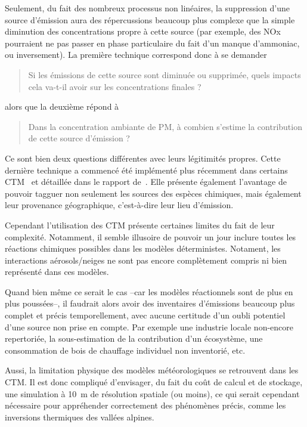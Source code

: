 Seulement, du fait des nombreux processus non linéaires, la suppression d'une source
d'émission aura des répercussions beaucoup plus complexe que la simple diminution des
concentrations propre à cette source (par exemple, des NOx pourraient ne pas passer en
phase particulaire du fait d'un manque d'ammoniac, ou inversement). La première technique
correspond donc à se demander 
\begin{quote}
    Si les émissions de cette source sont diminuée ou supprimée, quels impacts cela va-t-il
    avoir sur les concentrations finales ?
\end{quote}
alors que la deuxième répond à
\begin{quote}
    Dans la concentration ambiante de PM, à combien s'estime la contribution de cette source
    d'émission ?
\end{quote}
Ce sont bien deux questions différentes avec leurs légitimités propres.
Cette dernière technique a commencé été implémenté plus récemment dans certains
CTM~\autocite{wangDevelopment2009,wagstromDevelopment2008,kranenburgSource2013,brandtContribution2013}
et détaillée dans le rapport de~\textcite{mirceaEuropean2020}. Elle présente également
l'avantage de pouvoir tagguer non seulement les sources des espèces chimiques, mais
également leur provenance géographique, c'est-à-dire leur lieu d'émission.

Cependant l'utilisation des CTM présente certaines limites du fait de leur complexité.
Notamment, il semble illusoire de pouvoir un jour inclure toutes les réactions chimiques
possibles dans les modèles déterministes. Notament, les interactions aérosols/neiges ne
sont pas encore complètement compris ni bien représenté dans ces modèles.

Quand bien même ce serait le cas --car les modèles réactionnels sont de plus en plus
poussées--, il faudrait alors avoir des inventaires d'émissions beaucoup plus complet et
précis temporellement, avec aucune certitude d'un oubli potentiel d'une source non prise
en compte. Par exemple une industrie locale non-encore repertoriée, la sous-estimation de
la contribution d'un écosystème, une consommation de bois de chauffage individuel non
inventorié, etc.

Aussi, la limitation physique des modèles météorologiques se retrouvent dans les CTM. Il
est donc compliqué d'envisager, du fait du coût de calcul et de stockage, une simulation à
\SI{10}{m} de résolution spatiale (ou moins), ce qui serait cependant nécessaire pour
appréhender correctement des phénomènes précis, comme les inversions thermiques des
vallées alpines.

